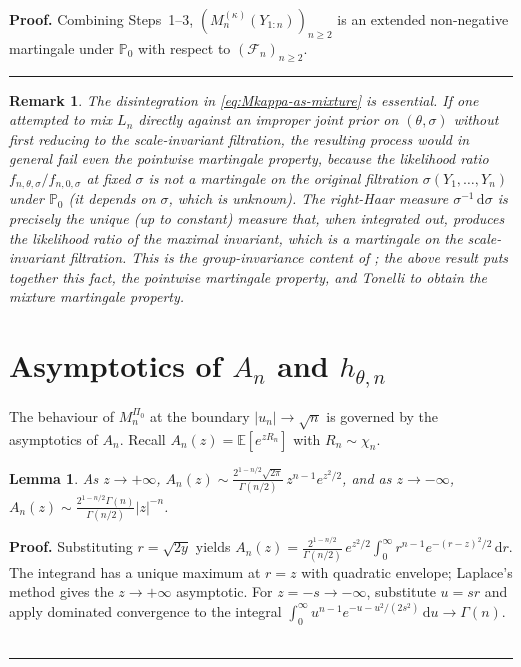 \documentclass{article}%
\newtheorem{lemma}[theorem]{Lemma}
\newtheorem{remark}[theorem]{Remark}
\newenvironment{proof}[1][Proof]{\noindent\textbf{#1.} }{\ \rule{0.5em}{0.5em}}
\newcommand{\E}{\mathbb{E}}
\newcommand{\dd}{\,\mathrm{d}}
\newcommand{\1}{\mathbf{1}}
\begin{document}
\begin{proof}
\smallskip\noindent Combining Steps~1--3, $(M_n^{(\kappa)}(Y_{1:n}))_{n\geq 2}$
is an extended non-negative martingale under $\mathbb{P}_0$ with respect to
$(\mathcal{F}_n)_{n\geq 2}$.
\end{proof}

\begin{remark}
    The disintegration in \eqref{eq:Mkappa-as-mixture} is essential. If one attempted to mix \(L_n\) directly against an improper joint prior on \((\theta,\sigma)\) without first reducing to the scale-invariant filtration, the resulting process would in general fail even the pointwise martingale property, because the likelihood ratio
\(f_{n,\theta,\sigma}/f_{n,0,\sigma}\) at fixed \(\sigma\) is not a
martingale on the original filtration \(\sigma(Y_1,\ldots,Y_n)\) under
\(\mathbb{P}_0\) (it depends on \(\sigma\), which is unknown). The
right-Haar measure \(\sigma^{-1}\dd\sigma\) is precisely the unique
(up to constant) measure that, when integrated out, produces the
likelihood ratio of the maximal invariant, which is a
martingale on the scale-invariant filtration. This is the
group-invariance content of \cite{PerezOrtiz2024}; the above result puts together this fact, the pointwise martingale property,
and Tonelli to obtain the mixture martingale property.
\end{remark}





\section{Asymptotics of \(A_n\) and \(h_{\theta,n}\)}
The behaviour of \(M_n^{\Pi_0}\) at the boundary \(|u_n|\to\sqrt n\) is
governed by the asymptotics of \(A_n\). Recall \(A_n(z)=\E[e^{zR_n}]\)
with \(R_n\sim\chi_n\).

\begin{lemma}\label{lem:An-asymp}
As \(z\to+\infty\),
\(A_n(z)\sim \frac{2^{1-n/2}\sqrt{2\pi}}{\Gamma(n/2)}\,z^{n-1}e^{z^2/2}\),
and as \(z\to-\infty\),
\(A_n(z)\sim \frac{2^{1-n/2}\Gamma(n)}{\Gamma(n/2)}|z|^{-n}\).
\end{lemma}

\begin{proof}
Substituting \(r=\sqrt{2y}\) yields
\(A_n(z) = \frac{2^{1-n/2}}{\Gamma(n/2)}\,e^{z^2/2}\int_0^\infty
r^{n-1}e^{-(r-z)^2/2}\dd r\). The integrand has a unique maximum at
\(r=z\) with quadratic envelope; Laplace's method gives the
\(z\to+\infty\) asymptotic. For \(z=-s\to-\infty\), substitute
\(u=sr\) and apply dominated convergence to the integral
\(\int_0^\infty u^{n-1}e^{-u-u^2/(2s^2)}\dd u\to\Gamma(n)\).
\end{proof}
\end{document}
